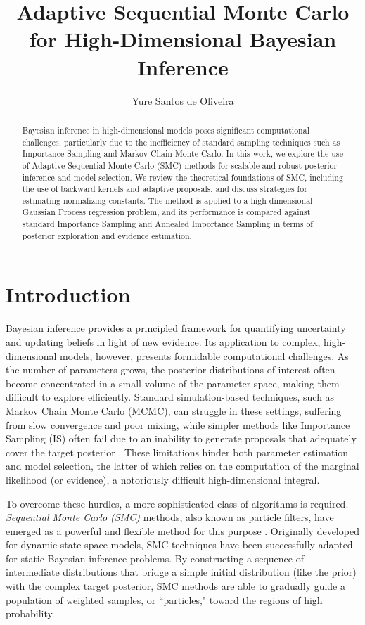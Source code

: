 \documentclass[a4paper, 12pt]{article}
\title{\vspace{-6ex} \bf Adaptive Sequential Monte Carlo for High-Dimensional Bayesian Inference}
\author{Yure Santos de Oliveira}
\affil{\vspace{-2ex} School of Applied Mathematics, Getulio Vargas Foundation}
\begin{document}
    \maketitle

    \begin{abstract}
        Bayesian inference in high-dimensional models poses significant computational challenges, particularly due to the inefficiency of standard sampling techniques such as Importance Sampling and Markov Chain Monte Carlo. In this work, we explore the use of Adaptive Sequential Monte Carlo (SMC) methods for scalable and robust posterior inference and model selection. We review the theoretical foundations of SMC, including the use of backward kernels and adaptive proposals, and discuss strategies for estimating normalizing constants. The method is applied to a high-dimensional Gaussian Process regression problem, and its performance is compared against standard Importance Sampling and Annealed Importance Sampling in terms of posterior exploration and evidence estimation.
    \end{abstract}


    \section{Introduction}

    Bayesian inference provides a principled framework for quantifying uncertainty and updating beliefs in light of new evidence. Its application to complex, high-dimensional models, however, presents formidable computational challenges. As the number of parameters grows, the posterior distributions of interest often become concentrated in a small volume of the parameter space, making them difficult to explore efficiently. Standard simulation-based techniques, such as Markov Chain Monte Carlo (MCMC), can struggle in these settings, suffering from slow convergence and poor mixing, while simpler methods like Importance Sampling (IS) often fail due to an inability to generate proposals that adequately cover the target posterior \citep{Robert2004}. These limitations hinder both parameter estimation and model selection, the latter of which relies on the computation of the marginal likelihood (or evidence), a notoriously difficult high-dimensional integral.

    To overcome these hurdles, a more sophisticated class of algorithms is required. \emph{Sequential Monte Carlo (SMC)} methods, also known as particle filters, have emerged as a powerful and flexible method for this purpose \citep{Doucet2001}. Originally developed for dynamic state-space models, SMC techniques have been successfully adapted for static Bayesian inference problems. By constructing a sequence of intermediate distributions that bridge a simple initial distribution (like the prior) with the complex target posterior, SMC methods are able to gradually guide a population of weighted samples, or ``particles," toward the regions of high probability.
\end{document}
